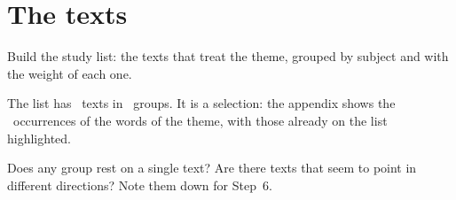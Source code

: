 \chapter{The texts}

\begin{objetivo}
Build the study list: the texts that treat the theme, grouped by subject and
with the weight of each one.
\end{objetivo}

The list has \temaNTextos\ texts in \temaNGrupos\ groups. It is a selection:
the appendix shows the \temaNOcorrencias\ occurrences of the words of the
theme, with those already on the list highlighted.

\textosdotema

\begin{pergunta}
Does any group rest on a single text? Are there texts that seem to point in
different directions? Note them down for Step~6.
\end{pergunta}
